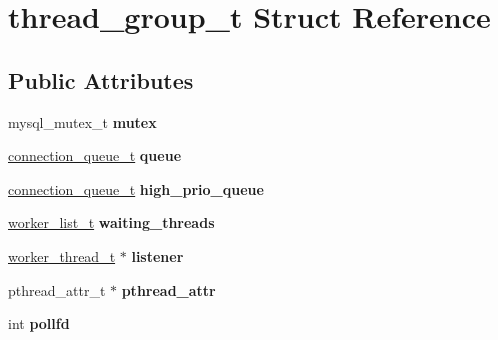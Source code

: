 \hypertarget{structthread__group__t}{}\section{thread\+\_\+group\+\_\+t Struct Reference}
\label{structthread__group__t}
\subsection*{Public Attributes}
\begin{DoxyCompactItemize}
\item 
\mbox{\label{structthread__group__t_ab90c97255d3858c51cc1c80752eb0d92}} 
mysql\+\_\+mutex\+\_\+t {\bfseries mutex}
\item 
\mbox{\label{structthread__group__t_aa798b75d5b87d4aa558fb099d133e4e2}} 
\mbox{\hyperlink{classI__P__List}{connection\+\_\+queue\+\_\+t}} {\bfseries queue}
\item 
\mbox{\label{structthread__group__t_a306b35311f3f479cf73f540e049a8839}} 
\mbox{\hyperlink{classI__P__List}{connection\+\_\+queue\+\_\+t}} {\bfseries high\+\_\+prio\+\_\+queue}
\item 
\mbox{\label{structthread__group__t_a087b594b7e2250a96e04121f93737bea}} 
\mbox{\hyperlink{classI__P__List}{worker\+\_\+list\+\_\+t}} {\bfseries waiting\+\_\+threads}
\item 
\mbox{\label{structthread__group__t_ad9a84dfd6bab03629a57bcd447c42d07}} 
\mbox{\hyperlink{structworker__thread__t}{worker\+\_\+thread\+\_\+t}} $\ast$ {\bfseries listener}
\item 
\mbox{\label{structthread__group__t_abbef27e2b2a1c198e79d6bd3a07ff5cd}} 
pthread\+\_\+attr\+\_\+t $\ast$ {\bfseries pthread\+\_\+attr}
\item 
\mbox{\label{structthread__group__t_a3ca8d35359e088f609d9728027d729a0}} 
int {\bfseries pollfd}
\item 
\mbox{\label{structthread__group__t_ab7123eea195b8a2c96b27a8876a0a5b2}} 

\end{DoxyCompactItemize}
